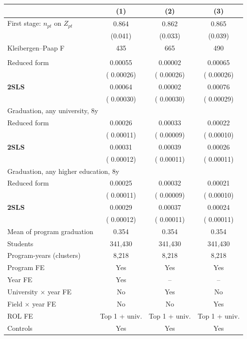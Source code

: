 \begin{tabular}{lccc}
\toprule
 & (1) & (2) & (3) \\
\midrule
First stage: \(n_{pt}\) on \(Z_{pt}\) &  0.864\sym{***} &  0.862\sym{***} &  0.865\sym{***} \\
 & (0.041) & (0.033) & (0.039) \\
Kleibergen--Paap F &    435 &    665 &    490 \\
\addlinespace
\multicolumn{4}{l}{Graduation, enrolled program, 8y} \\
\quad Reduced form &  0.00055\sym{**} &  0.00002 &  0.00065\sym{**} \\
 & ( 0.00026) & ( 0.00026) & ( 0.00026) \\
\quad \textbf{2SLS} &  0.00064\sym{**} &  0.00002 &  0.00076\sym{***} \\
 & ( 0.00030) & ( 0.00030) & ( 0.00029) \\
\multicolumn{4}{l}{Graduation, any university, 8y} \\
\quad Reduced form &  0.00026\sym{**} &  0.00033\sym{***} &  0.00022\sym{**} \\
 & ( 0.00011) & ( 0.00009) & ( 0.00010) \\
\quad \textbf{2SLS} &  0.00031\sym{**} &  0.00039\sym{***} &  0.00026\sym{**} \\
 & ( 0.00012) & ( 0.00011) & ( 0.00011) \\
\multicolumn{4}{l}{Graduation, any higher education, 8y} \\
\quad Reduced form &  0.00025\sym{**} &  0.00032\sym{***} &  0.00021\sym{**} \\
 & ( 0.00011) & ( 0.00009) & ( 0.00010) \\
\quad \textbf{2SLS} &  0.00029\sym{**} &  0.00037\sym{***} &  0.00024\sym{**} \\
 & ( 0.00012) & ( 0.00011) & ( 0.00011) \\
\midrule
Mean of program graduation & 0.354 & 0.354 & 0.354 \\
Students &   341,430 &   341,430 &   341,430 \\
Program-years (clusters) &  8,218 &  8,218 &  8,218 \\
\midrule
Program FE & Yes & Yes & Yes \\
Year FE & Yes & -- & -- \\
University \(\times\) year FE & No & Yes & No \\
Field \(\times\) year FE & No & No & Yes \\
ROL FE & Top 1 + univ. & Top 1 + univ. & Top 1 + univ. \\
Controls & Yes & Yes & Yes \\
\bottomrule
\end{tabular}
